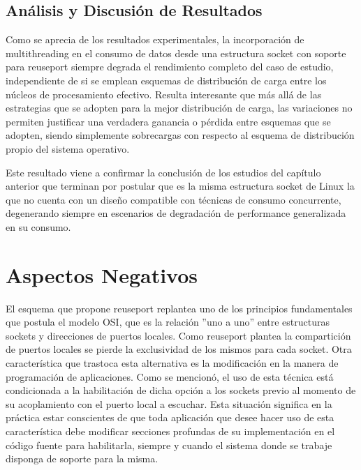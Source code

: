 \subsection{Análisis y Discusión de Resultados}
Como se aprecia de los resultados experimentales, la incorporación de multithreading en el consumo de datos desde una estructura socket con soporte para reuseport siempre degrada el rendimiento completo del caso de estudio, independiente de si se emplean esquemas de distribución de carga entre los núcleos de procesamiento efectivo. Resulta interesante que más allá de las estrategias que se adopten para la mejor distribución de carga, las variaciones no permiten justificar una verdadera ganancia o pérdida entre esquemas que se adopten, siendo simplemente sobrecargas con respecto al esquema de distribución propio del sistema operativo.

Este resultado viene a confirmar la conclusión de los estudios del capítulo anterior que terminan por postular que es la misma estructura socket de Linux la que no cuenta con un diseño compatible con técnicas de consumo concurrente, degenerando siempre en escenarios de degradación de performance generalizada en su consumo.

\section{Aspectos Negativos}
El esquema que propone reuseport replantea uno de los principios fundamentales que postula el modelo OSI, que es la relación ''uno a uno'' entre estructuras sockets y direcciones de puertos locales. Como reuseport plantea la compartición de puertos locales se pierde la exclusividad de los mismos para cada socket. Otra característica que trastoca esta alternativa es la modificación en la manera de programación de aplicaciones. Como se mencionó, el uso de esta técnica está condicionada a la habilitación de dicha opción a los sockets previo al momento de su acoplamiento con el puerto local a escuchar. Esta situación significa en la práctica estar conscientes de que toda aplicación que desee hacer uso de esta característica debe modificar secciones profundas de su implementación en el código fuente para habilitarla, siempre y cuando el sistema donde se trabaje disponga de soporte para la misma.

